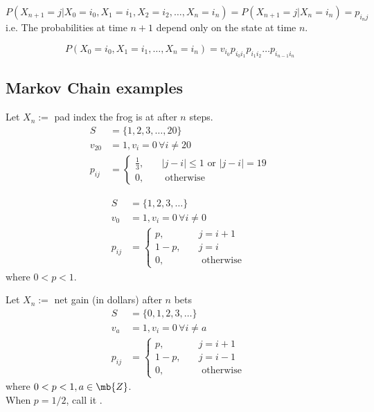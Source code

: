\documentclass[11pt]{article}
\begin{document}
    $$P(X_{n+1} = j | X_0 = i_0, X_1 = i_1, X_2 = i_2, \hdots, X_n = i_n) = P(X_{n+1} = j | X_n = i_n) = p_{i_nj}$$
    i.e. The probabilities at time $n+1$ depend only on the state at time $n$.
    
    \remark
    $$P(X_0 = i_0, X_1 = i_1, \hdots, X_n = i_n) = v_{i_0}p_{i_0i_1}p_{i_1i_2} \hdots p_{i_{n-1}i_n}$$
    
    \subsection{Markov Chain examples}
    Let $X_n :=$ pad index the frog is at after $n$ steps.
    \begin{align*}
    	S &= \{1, 2, 3, \hdots, 20\}\\
    	v_{20} &= 1, v_i = 0 \, \forall i \neq 20 \\
    	p_{ij} &= \begin{cases}
    		\frac{1}{3}, \quad &|j - i| \leq 1 \text{ or } |j - i| = 19\\
    	0, \quad &\text{ otherwise }
    	\end{cases}
    \end{align*}
    
    \begin{align*}
    	S &= \{1, 2, 3, \hdots \}\\
    	v_{0} &= 1, v_i = 0 \, \forall i \neq 0 \\
    	p_{ij} &= \begin{cases}
    		p, \quad  &j = i + 1\\
    		1 - p, \quad &j = i \\
    		0, \quad &\text{ otherwise }
    	\end{cases}
    \end{align*}
    where $0 < p < 1$.
    
    Let $X_n :=$ net gain (in dollars) after $n$ bets
    \begin{align*}
    	S &= \{0, 1, 2, 3, \hdots \}\\
    	v_{a} &= 1, v_i = 0 \, \forall i \neq a \\
    	p_{ij} &= \begin{cases}
    		p, \quad  &j = i + 1\\
    		1 - p, \quad &j = i - 1 \\
    		0, \quad &\text{ otherwise }
    	\end{cases}
    \end{align*}
    where $0 < p < 1, a \in \mb{Z}$. \\
     When $p = 1/2$, call it .
    
\end{document}
